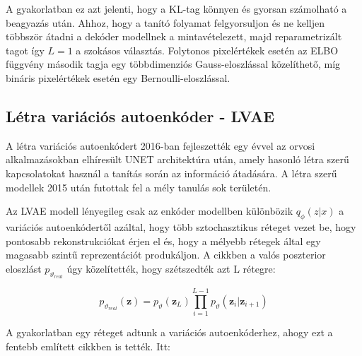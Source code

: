 \documentclass[12pt, english]{article}
\begin{document}
\vspace{4mm}

\par A gyakorlatban ez azt jelenti, hogy a KL-tag könnyen és gyorsan számolható a beagyazás után. Ahhoz, hogy a tanító folyamat felgyorsuljon és ne kelljen többször átadni a dekóder modellnek a mintavételezett, majd reparametrizált tagot így $L = 1$ a szokásos választás. Folytonos pixelértékek esetén az ELBO függvény második tagja egy többdimenziós Gauss-eloszlással közelíthető, míg bináris pixelértékek esetén egy Bernoulli-eloszlással.

\subsection{Létra variációs autoenkóder - LVAE}

\vspace{5mm}

\par A létra variációs autoenkódert 2016-ban fejleszették \cite{sonderby2016ladder} egy évvel az orvosi alkalmazásokban elhíresült UNET \cite{ronneberger2015u} architektúra után, amely hasonló létra szerű kapcsolatokat használ a tanítás során az információ átadására. A létra szerű modellek 2015 után futottak fel a mély tanulás sok területén.

\vspace{4mm}

\par Az LVAE modell lényegileg csak az enkóder modellben különbözik $q_{\phi} (z | x)$ a variációs autoenkódertől azáltal, hogy több sztochasztikus réteget vezet be, hogy pontosabb rekonstrukciókat érjen el és, hogy a mélyebb rétegek által egy magasabb szintű reprezentációt produkáljon. A \cite{sonderby2016ladder} cikkben a valós poszterior eloszlást $p_{\vartheta_{real}}$  úgy közelítették, hogy szétszedték azt L rétegre:

\vspace{4mm}

\begin{equation}
    p_{\vartheta_{real}}(\bm{z}) =  p_{\vartheta}(\bm{z}_{L})\prod_{i = 1}^{L - 1}p_{\vartheta}(\bm{z}_i | \bm{z}_{i+1})
\end{equation}

\vspace{4mm}

\par A gyakorlatban egy réteget adtunk a variációs autoenkóderhez, ahogy ezt a fentebb említett cikkben is tették. Itt:
\end{document}
